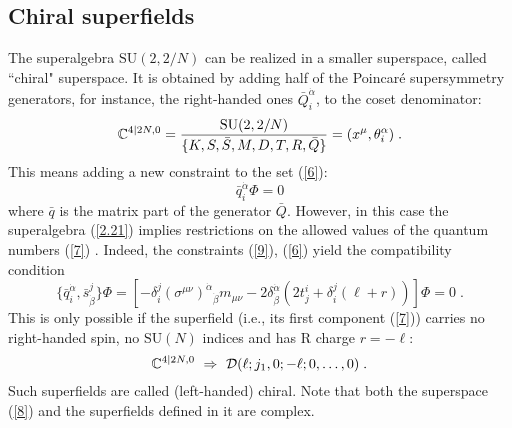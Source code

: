 \documentclass[a4paper,12pt]{article}
\begin{document}
\subsection{Chiral superfields}\label{chsup}

The superalgebra $\mbox{SU}(2,2/N)$ can be realized in a smaller 
superspace, called ``chiral" superspace. It is obtained by adding 
half of the Poincar\'{e} supersymmetry generators, for instance, the 
right-handed ones $\bar Q^{\dot\alpha}_i$, to the coset 
denominator: 
\begin{equation}
{\mathbb C}^{4\vert 2N,0} = {\mbox{SU}(2,2/N)\over \{K,S,\bar 
S,M,D,T,R,\bar Q\}} = (x^\mu,\theta^{\alpha}_i)\;. \label{8} 
\end{equation} 
This means adding a new constraint to the set (\ref{6}):
\begin{equation}\label{9}
  \bar q^{\dot\alpha}_i\Phi=0
\end{equation}
where $\bar q$ is the matrix part of the generator $\bar Q$. 
However, in this case the superalgebra (\ref{2.21}) implies 
restrictions on the allowed values of the quantum numbers 
(\ref{7}) \cite{wz}. Indeed, the constraints (\ref{9}), (\ref{6}) 
yield the compatibility condition 
\begin{equation}\label{10}
\{\bar q^{\dot\alpha}_i, \bar s^j_{\dot\beta} \}\Phi = \left[ 
-\delta^j_i (\sigma^{\mu\nu})^{\dot\alpha}{}_{\dot\beta}m_{\mu\nu} 
-2\delta^{\dot\alpha}_{\dot\beta}\left(2t^i_j +\delta^j_i(\ell+r) 
\right)\right] \Phi = 0\;. 
\end{equation}
This is only possible if the superfield (i.e., its first component 
(\ref{7})) carries no right-handed spin, no $\mbox{SU}(N)$ indices 
and has R charge $r=-\ell$: 
\begin{equation}\label{11}
  {\mathbb C}^{4\vert 2N,0} \ \Rightarrow \ 
{\cal D}(\ell;j_1,0;-\ell;0,\ldots,0)\;. 
\end{equation}
Such superfields are called (left-handed) chiral. Note that both 
the superspace (\ref{8}) and the superfields defined in it are 
complex. 
 
\end{document}
